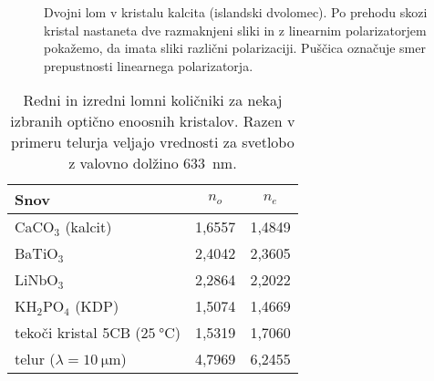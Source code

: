 \begin{figure}[h]
\centering
\def\svgwidth{140truemm} 

\caption{Dvojni lom v kristalu kalcita (islandski dvolomec). 
Po prehodu skozi kristal nastaneta dve razmaknjeni sliki in z linearnim polarizatorjem 
pokažemo, da imata sliki različni polarizaciji. Puščica označuje smer prepustnosti
linearnega polarizatorja.}
\label{foto:dvolom}
\end{figure}

\begin{table}[h]
 \centering
\begin{tabular}{|l|c|c|} \hline  
      Snov & $n_o$ & $n_e$ \\ \hline
      CaCO$_3$ (kalcit) & 1,6557 & 1,4849 \\ \hline\index{CaCO$_3$|see {Kalcit}}
      BaTiO$_3$ & 2,4042 & 2,3605 \\ \hline \index{BaTiO$_3$}
      LiNbO$_3$ & 2,2864 & 2,2022 \\ \hline \index{LiNbO$_3$}
      KH$_2$PO$_4$ (KDP) & 1,5074 & 1,4669 \\ \hline \index{KH$_2$PO$_4$|see {KDP}}\index{KDP}
      tekoči kristal 5CB ($25~\si{\degreeCelsius}$) & 1,5319 & 1,7060 \\ 
      \hline \index{Tekoči kristali} \index{Telur}\index{Tekoči kristali!5CB}
      telur ($\lambda = 10~\si{\micro\metre}$) & 4,7969 & 6,2455 \\ 
\hline 
\end{tabular}
  \caption{Redni in izredni lomni količniki za nekaj izbranih optično enoosnih kristalov. Razen v primeru telurja
   veljajo vrednosti za svetlobo z valovno dolžino 633~\si{\nano\metre}.}
\label{table:none}
\end{table}


